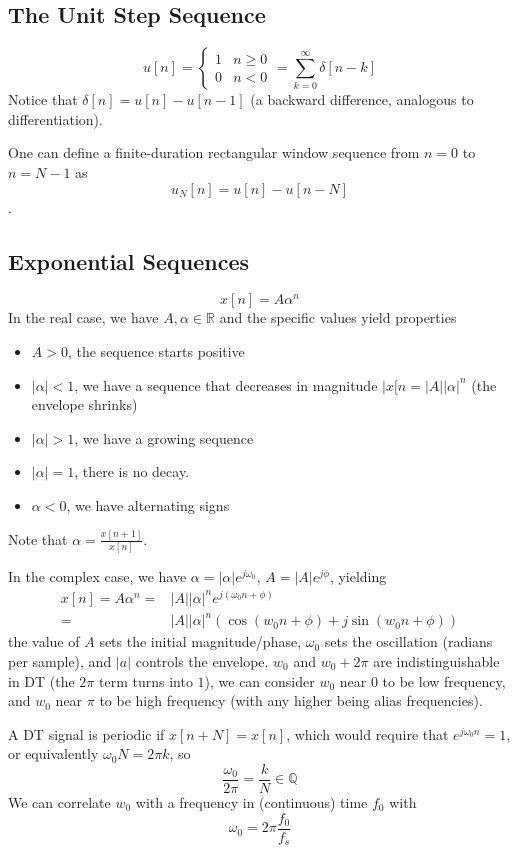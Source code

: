 \documentclass{article}
\begin{document}
\subsection{The Unit Step Sequence}

\[
    u[n] = \begin{cases}
    1 & n\ge0\\
    0 & n<0
    \end{cases} = \sum_{k=0}^\infty \delta[n-k]
\]
Notice that $\delta[n] = u[n] - u[n-1]$ (a backward difference, analogous to differentiation).

One can define a finite-duration rectangular window sequence from $n=0$ to $n=N-1$ as $$u_N[n] = u[n]  - u[n-N]$$.

\subsection{Exponential Sequences}
\[
    x[n] = A\alpha^n
\]
In the real case, we have $A,\alpha\in\mathbb{R}$ and the specific values yield properties
\begin{itemize}
	\item $A>0$, the sequence starts positive
	\item $|\alpha|<1$, we have a sequence that decreases in magnitude $|x[n = |A||\alpha|^n$ (the envelope shrinks)
	\item $|\alpha|>1$, we have a growing sequence
	\item $|\alpha|=1$, there is no decay.
	\item $\alpha<0$, we have alternating signs
\end{itemize}
Note that $\alpha = \frac{x[n+1]}{x[n]}$.

In the complex case, we have $\alpha=|\alpha|e^{j\omega_0}$, $A=|A|e^{j\phi}$, yielding
\begin{align}
    x[n] = A\alpha^n=&|A||\alpha|^ne^{j(\omega_0 n + \phi)}\\
                    =&|A||\alpha|^n(\cos(w_0n+\phi) + j\sin(w_0n+\phi))
\end{align}
the value of $A$ sets the initial magnitude/phase, $\omega_0$ sets the oscillation (radians per sample), and $|a|$ controls the envelope.
$w_0$ and $w_0+2\pi$ are indistinguishable in DT (the $2\pi$ term turns into $1$), we can consider $w_0$ near $0$ to be low frequency, and $w_0$ near $\pi$ to be high frequency (with any higher being alias frequencies).

A DT signal is periodic if $x[n+N] = x[n]$, which would require that $e^{j\omega_0n} = 1$, or equivalently $\omega_0N = 2\pi k$, so \[\frac{\omega_0}{2\pi} = \frac{k}{N}\in\mathbb{Q}\]
We can correlate $w_0$ with a frequency in (continuous) time $f_0$ with \[\omega_0=2\pi\frac{f_0}{f_s}\]
\end{document}
